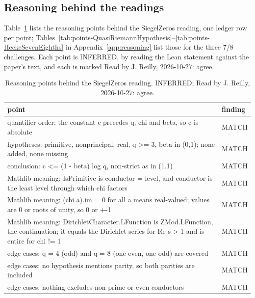 \subsection{Reasoning behind the readings}

Table~\ref{tab:points-SiegelZeros} lists the reasoning points behind the SiegelZeros reading, one ledger row per point; Tables~\ref{tab:points-QuasiRiemannHypothesis}--\ref{tab:points-HeckeSevenEighths} in Appendix~\ref{app:reasoning} list those for the three 7/8 challenges.
Each point is INFERRED, by reading the Lean statement against the paper's text, and each is marked Read by J. Reilly, 2026-10-27: agree.

\begin{table}[!htbp]
\caption{Reasoning points behind the SiegelZeros reading. INFERRED; Read by J. Reilly, 2026-10-27: agree.}\label{tab:points-SiegelZeros}
\scriptsize\setlength{\tabcolsep}{3pt}\renewcommand{\arraystretch}{0.95}
\begin{tabularx}{\textwidth}{@{}>{\raggedright\arraybackslash}Xl@{}}
\toprule
point & finding \\
\midrule
quantifier order: the constant c precedes q, chi and beta, so c is absolute & MATCH \\
hypotheses: primitive, nonprincipal, real, q >= 3, beta in (0,1); none added, none missing & MATCH \\
conclusion: c <= (1 - beta) log q, non-strict as in (1.1) & MATCH \\
Mathlib meaning: IsPrimitive is conductor = level, and conductor is the least level through which chi factors & MATCH \\
Mathlib meaning: (chi a).im = 0 for all a means real-valued; values are 0 or roots of unity, so 0 or +-1 & MATCH \\
Mathlib meaning: DirichletCharacter.LFunction is ZMod.LFunction, the continuation; it equals the Dirichlet series for Re s > 1 and is entire for chi != 1 & MATCH \\
edge cases: q = 4 (odd) and q = 8 (one even, one odd) are covered & MATCH \\
edge cases: no hypothesis mentions parity, so both parities are included & MATCH \\
edge cases: nothing excludes non-prime or even conductors & MATCH \\
\bottomrule
\end{tabularx}
\end{table}


